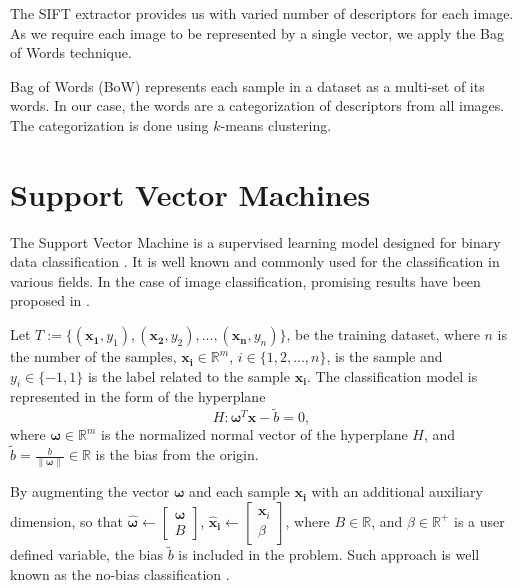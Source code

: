\documentclass{aip-cp}
\newcommand{\norm}[1]{\left\lVert#1\right\rVert}
\begin{document}
The SIFT extractor provides us with varied number of descriptors for each image. As we require each image to be represented by a single vector, we apply the Bag of Words technique.

Bag of Words (BoW) represents each sample in a dataset as a multi-set of its words. In our case, the words are a categorization of descriptors from all images. The categorization is done using $k$-means clustering.

\section{Support Vector Machines}
The Support Vector Machine is a supervised learning model designed for binary data classification \cite{boser1992}. It is well known and commonly used for the classification in various fields. In the case of image classification, promising results have been proposed in \cite{dornak2020}.

Let \( T := \{(\boldsymbol{x_1}, y_1),(\boldsymbol{x_2}, y_2),...,(\boldsymbol{x_n}, y_n)\} \),
be the training dataset, where $n$ is the number of the samples, \( \boldsymbol{x_i} \in \mathbb{R}^m \), \( i \in \{1,2,\dots,n\} \),
is the sample and \( y_i \in \{-1, 1\} \) is the label related to the sample \( \boldsymbol{x_i} \). The classification model is represented in the form of the hyperplane
\begin{equation}
    H: \boldsymbol{\omega}^T\boldsymbol{x}-\widetilde{b}=0,
    \label{eq:svm:hyperplane}
\end{equation}
where \( \boldsymbol{\omega} \in \mathbb{R}^{m} \) is the normalized normal vector of the hyperplane \( H \), and \( \widetilde{b} = \frac{b}{\norm{\boldsymbol{\omega}}} \in \mathbb{R} \) is the bias from the origin.

By augmenting the vector \(\boldsymbol{\omega}\) and each sample \( \boldsymbol{x_i} \) with an additional auxiliary dimension, so that \( \boldsymbol{\widehat{\omega}} \leftarrow \begin{bmatrix}\boldsymbol{\omega} \\ B \end{bmatrix}\), \(\boldsymbol{\widehat{x}_i} \leftarrow \begin{bmatrix}\boldsymbol{x}_i \\ \beta \end{bmatrix}\), where \(B \in \mathbb{R}\), and \(\beta \in \mathbb{R}^+\) is a user defined variable, the bias \(\widetilde{b}\) is included in the problem. Such approach is well known as the no-bias classification \cite{Aeta2018}.
\end{document}
